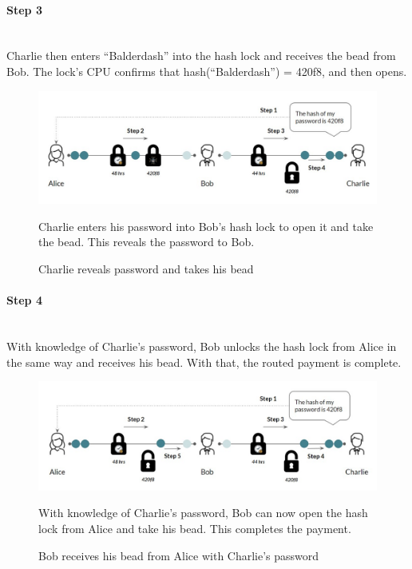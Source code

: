 \documentclass[a4paper, 12pt]{report}
\begin{document}
\paragraph{Step 3} \hspace{0pt} \\
Charlie then enters “Balderdash” into the hash lock and receives the bead from Bob. The lock’s CPU confirms that hash(“Balderdash”) = 420f8, and then opens.

\begin{figure}[H]
	\includegraphics[width=\textwidth]{13_HTLC_Step3}
	\caption{Charlie reveals password and takes his bead}
	\medskip
	\small Charlie enters his password into Bob's hash lock to open it and take the bead. This reveals the password to Bob.
	\label{fig:13_HTLC_Step3}
\end{figure} 

\paragraph{Step 4} \hspace{0pt} \\
With knowledge of Charlie’s password, Bob unlocks the hash lock from Alice in the same way and receives his bead. With that, the routed payment is complete.

\begin{figure}[H]
	\includegraphics[width=\textwidth]{14_HTLC_Step4}
	\caption{Bob receives his bead from Alice with Charlie's password}
	\medskip
	\small With knowledge of Charlie's password, Bob can now open the hash lock from Alice and take his bead. This completes the payment.
	\label{fig:14_HTLC_Step4}
\end{figure} 
\end{document}
